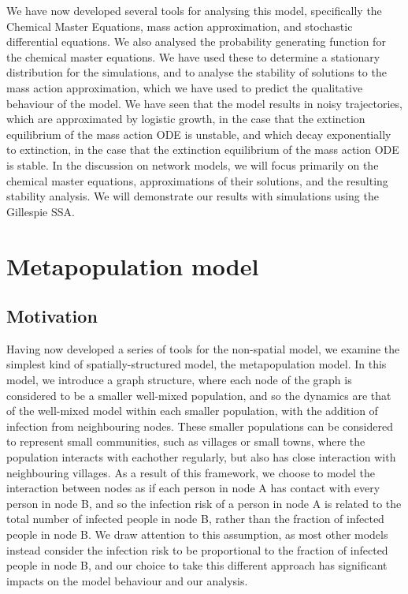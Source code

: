 \documentclass[12pt,a4paper,openany,twoside]{book}
\begin{document}
We have now developed several tools for analysing this model, specifically the Chemical Master Equations, mass action approximation, and stochastic differential equations. We also analysed the probability generating function for the chemical master equations. We have used these to determine a stationary distribution for the simulations, and to analyse the stability of solutions to the mass action approximation, which we have used to predict the qualitative behaviour of the model. We have seen that the model results in noisy trajectories, which are approximated by logistic growth, in the case that the extinction equilibrium of the mass action ODE is unstable, and which decay exponentially to extinction, in the case that the extinction equilibrium of the mass action ODE is stable. In the discussion on network models, we will focus primarily on the chemical master equations, approximations of their solutions, and the resulting stability analysis. We will demonstrate our results with simulations using the Gillespie SSA.


\chapter{Metapopulation model}

\section{Motivation}

Having now developed a series of tools for the non-spatial model, we examine the simplest kind of spatially-structured model, the metapopulation model. In this model, we introduce a graph structure, where each node of the graph is considered to be a smaller well-mixed population, and so the dynamics are that of the well-mixed model within each smaller population, with the addition of infection from neighbouring nodes. These smaller populations can be considered to represent small communities, such as villages or small towns, where the population interacts with eachother regularly, but also has close interaction with neighbouring villages. As a result of this framework, we choose to model the interaction between nodes as if each person in node A has contact with every person in node B, and so the infection risk of a person in node A is related to the total number of infected people in node B, rather than the fraction of infected people in node B. We draw attention to this assumption, as most other models instead consider the infection risk to be proportional to the fraction of infected people in node B, and our choice to take this different approach has significant impacts on the model behaviour and our analysis.
\end{document}
